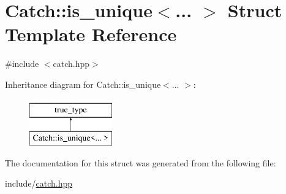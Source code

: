 \hypertarget{struct_catch_1_1is__unique}{}\section{Catch\+::is\+\_\+unique$<$... $>$ Struct Template Reference}
\label{struct_catch_1_1is__unique}


{\ttfamily \#include $<$catch.\+hpp$>$}

Inheritance diagram for Catch\+::is\+\_\+unique$<$... $>$\+:\begin{figure}[H]
\begin{center}
\leavevmode
\includegraphics[height=2.000000cm]{struct_catch_1_1is__unique}
\end{center}
\end{figure}


The documentation for this struct was generated from the following file\+:\begin{DoxyCompactItemize}
\item 
include/\mbox{\hyperlink{catch_8hpp}{catch.\+hpp}}\end{DoxyCompactItemize}
